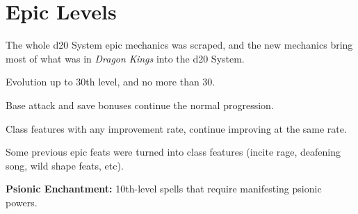 \section{Epic Levels}
The whole d20 System epic mechanics was scraped, and the new mechanics bring most of what was in \emph{Dragon Kings} into the d20 System.

\begin{itemize*}
\item Evolution up to 30th level, and no more than 30.
\item Base attack and save bonuses continue the normal progression.
\item Class features with any improvement rate, continue improving at the same rate.
\item Some previous epic feats were turned into class features (incite rage, deafening song, wild shape feats, etc).
\item \textbf{Psionic Enchantment:} 10th-level spells that require manifesting psionic powers.
\end{itemize*}
